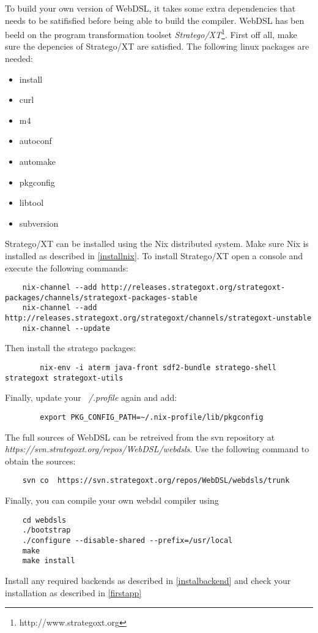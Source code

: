 To build your own version of WebDSL, it takes some extra dependencies that needs to be satifisfied before being able to build the compiler. WebDSL has ben beeld on the program transformation toolset \emph{Stratego/XT}\footnote{http://www.strategoxt.org}. First off all, make sure the depencies of Stratego/XT are satisfied. The following linux packages are needed:
\begin{itemize}
	\item install 
	\item curl 
	\item m4 
	\item autoconf 
	\item automake 
	\item pkgconfig 
	\item libtool 
	\item subversion
\end{itemize}

Stratego/XT can be installed using the Nix distributed system. Make sure Nix is installed as described in \ref{installnix}. To install Stratego/XT open a console and execute the following commands:
\begin{lstlisting}
    nix-channel --add http://releases.strategoxt.org/strategoxt-packages/channels/strategoxt-packages-stable
    nix-channel --add http://releases.strategoxt.org/strategoxt/channels/strategoxt-unstable
    nix-channel --update
\end{lstlisting}
Then install the stratego packages:
\begin{lstlisting}
		nix-env -i aterm java-front sdf2-bundle stratego-shell strategoxt strategoxt-utils
\end{lstlisting}
Finally, update your \emph{~/.profile} again and add:
\begin{lstlisting}
	    export PKG_CONFIG_PATH=~/.nix-profile/lib/pkgconfig
\end{lstlisting}

The full sources of WebDSL can be retreived from the svn repository at \emph{ https://svn.strategoxt.org/repos/WebDSL/webdsls}. Use the following command to obtain the sources:
\begin{lstlisting}
	svn co  https://svn.strategoxt.org/repos/WebDSL/webdsls/trunk
\end{lstlisting}
Finally, you can compile your own webdsl compiler using 
\begin{lstlisting}
    cd webdsls
    ./bootstrap
    ./configure --disable-shared --prefix=/usr/local
    make
    make install
\end{lstlisting}
Install any required backends as described in \ref{instalbackend} and check your installation as described in \ref{firstapp}

